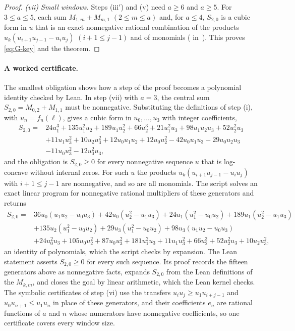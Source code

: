 \begin{proof}
\emph{(vii) Small windows.} Steps (iii$'$) and (v) need $a\geq6$ and $a\geq5$. For $3\leq a\leq5$, each sum $M_{1,m}+M_{m,1}$ $(2\leq m\leq a)$ and, for $a\leq4$, $S_{2,0}$ is a cubic form in $u$ that is an exact nonnegative rational combination of the products $u_k(u_{i+1}u_{j-1}-u_iu_j)$ $(i+1\leq j-1)$ and of monomials ( in~\cite{code}). This proves \eqref{eq:G-key} and the theorem.
\end{proof}

\paragraph{A worked certificate.} The smallest obligation shows how a step of the proof becomes a polynomial identity checked by Lean. In step (vii) with $a=3$, the central sum $S_{2,0}=M_{0,2}+M_{1,1}$ must be nonnegative. Substituting the definitions of step (i), with $u_n=f_n(\ell)$, gives a cubic form in $u_0,\ldots,u_3$ with integer coefficients,
\[
\begin{aligned}
S_{2,0}={}&24u_1^3+135u_1^2u_2+189u_1u_2^2+66u_2^3+21u_1^2u_3+98u_1u_2u_3+52u_2^2u_3\\
&+11u_1u_3^2+10u_2u_3^2+12u_0u_1u_2+12u_0u_2^2-42u_0u_1u_3-29u_0u_2u_3\\
&-11u_0u_3^2-12u_0^2u_3,
\end{aligned}
\]
and the obligation is $S_{2,0}\geq0$ for every nonnegative sequence $u$ that is log-concave without internal zeros. For such $u$ the products $u_k(u_{i+1}u_{j-1}-u_iu_j)$ with $i+1\leq j-1$ are nonnegative, and so are all monomials. The script  solves an exact linear program for nonnegative rational multipliers of these generators and returns
\[
\begin{aligned}
S_{2,0}={}&36u_0(u_1u_2-u_0u_3)+42u_0(u_2^2-u_1u_3)+24u_1(u_1^2-u_0u_2)+189u_1(u_2^2-u_1u_3)\\
&+135u_2(u_1^2-u_0u_2)+29u_3(u_1^2-u_0u_2)+98u_3(u_1u_2-u_0u_3)\\
&+24u_0^2u_3+105u_0u_2^2+87u_0u_3^2+181u_1^2u_3+11u_1u_3^2+66u_2^3+52u_2^2u_3+10u_2u_3^2,
\end{aligned}
\]
an identity of polynomials, which the script checks by expansion. The Lean statement  asserts $S_{2,0}\geq0$ for every such sequence. Its proof records the fifteen generators above as nonnegative facts, expands $S_{2,0}$ from the Lean definitions of the $M_{k,m}$, and closes the goal by linear arithmetic, which the Lean kernel checks. The symbolic certificates of step (vi) use the transfers $u_iu_j\geq u_1u_{i+j-1}$ and $u_0u_{n+1}\leq u_1u_n$ in place of these generators, and their coefficients $e_n$ are rational functions of $a$ and $n$ whose numerators have nonnegative coefficients, so one certificate covers every window size.

